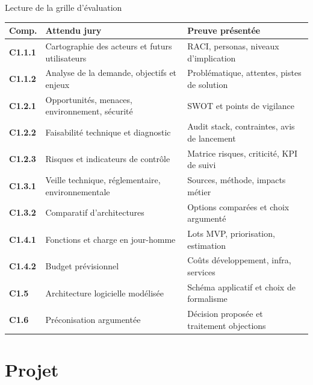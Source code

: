 \documentclass[aspectratio=169,11pt]{beamer}
\begin{document}
\begin{frame}[shrink=6]{Lecture de la grille d'évaluation}
  \small
  \begin{tabularx}{\textwidth}{>{\bfseries}p{1.8cm} X X}
    Comp. & Attendu jury & Preuve présentée \\
    \hline
    C1.1.1 & Cartographie des acteurs et futurs utilisateurs & RACI, personas, niveaux d'implication \\
    C1.1.2 & Analyse de la demande, objectifs et enjeux & Problématique, attentes, pistes de solution \\
    C1.2.1 & Opportunités, menaces, environnement, sécurité & SWOT et points de vigilance \\
    C1.2.2 & Faisabilité technique et diagnostic & Audit stack, contraintes, avis de lancement \\
    C1.2.3 & Risques et indicateurs de contrôle & Matrice risques, criticité, KPI de suivi \\
    C1.3.1 & Veille technique, réglementaire, environnementale & Sources, méthode, impacts métier \\
    C1.3.2 & Comparatif d'architectures & Options comparées et choix argumenté \\
    C1.4.1 & Fonctions et charge en jour-homme & Lots MVP, priorisation, estimation \\
    C1.4.2 & Budget prévisionnel & Coûts développement, infra, services \\
    C1.5 & Architecture logicielle modélisée & Schéma applicatif et choix de formalisme \\
    C1.6 & Préconisation argumentée & Décision proposée et traitement objections \\
  \end{tabularx}
\end{frame}

\section{Projet}
\end{document}

